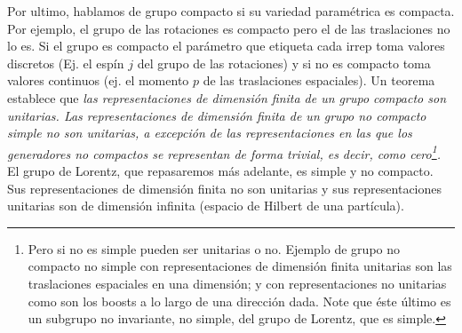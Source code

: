 Por ultimo, hablamos de grupo compacto si su variedad paramétrica es compacta. Por ejemplo, el grupo de las rotaciones es compacto pero el de las traslaciones no lo es. Si el grupo es compacto el parámetro que etiqueta cada irrep toma valores discretos (Ej. el espín $j$ del grupo de las rotaciones) y si no es compacto toma valores continuos (ej. el momento $p$ de las traslaciones espaciales). Un teorema establece que \emph{las representaciones de dimensión finita de un grupo compacto son unitarias. Las representaciones de dimensión finita de un grupo no compacto simple no son unitarias, a excepción de las representaciones en las que los generadores no compactos se representan de forma trivial, es decir, como cero\footnote{Pero si no es simple pueden ser unitarias o no. Ejemplo de grupo no compacto no simple con representaciones de dimensión finita unitarias son las traslaciones espaciales en una dimensión; y con representaciones no unitarias como son los boosts a lo largo de una dirección dada. Note que éste último es un subgrupo no invariante, no simple, del grupo de Lorentz, que es simple.}.}\\

El grupo de Lorentz, que repasaremos más adelante, es simple y no compacto. Sus representaciones de dimensión finita no son unitarias y sus representaciones unitarias son de dimensión infinita (espacio de Hilbert de una partícula).





